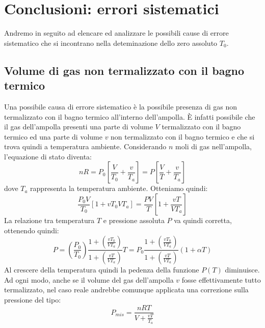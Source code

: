\section{Conclusioni: errori sistematici}
Andremo in seguito ad elencare ed analizzare le possibili cause di errore sistematico che si incontrano nella deteminazione dello zero assoluto $T_0$.

\subsection{Volume di gas non termalizzato con il bagno termico}
Una possibile causa di errore sistematico è la possibile presenza di gas non termalizzato con il bagno termico all'interno dell'ampolla.
È infatti possibile che il gas dell'ampolla presenti una parte di volume $V$ termalizzato con il bagno termico ed una parte di volume $v$ non termalizzato con il bagno termico e che si trova quindi a temperatura ambiente.
Considerando $n$ moli di gas nell'ampolla, l'equazione di stato diventa:
\begin{equation}
\label{eq:nR}
n R = P_0 \left[\frac{V}{T_0} + \frac{v}{T_a}\right] = P \left[\frac{V}{T} + \frac{v}{T_a}\right]
\end{equation}
dove $T_a$ rappresenta la temperatura ambiente.
Otteniamo quindi:
\begin{equation}
\frac{P_0 V}{T_0} \left[1 + v T_0 V T_a\right]= \frac{P V}{T} \left[1 + \frac{v T}{V T_a}\right]
\end{equation}
La relazione tra temperatura $T$  e pressione assoluta $P$ va quindi corretta, ottenendo quindi:
\begin{equation}
P = \left(\frac{P_0}{T_0}\right) \frac{1 + \left(\frac{v T_0}{V T_a} \right)}{1 + \left(\frac{v T}{V T_a}\right)} T = P_0 \frac{1 + \left(\frac {v T_0}{V T_a}\right)}{1 + \left(\frac{v T}{V T_a}\right)} \left(1 + \alpha T \right)
\end{equation}
Al crescere della temperatura quindi la pedenza della funzione $P(T)$ diminuisce.
Ad ogni modo, anche se il volume del gas dell'ampolla $v$ fosse effettivamente tutto termalizzato, nel caso reale andrebbe comunque applicata una correzione sulla pressione del tipo:
\begin{equation}
P_{mis} = \frac{n R T}{V + \frac{v T}{T_a}}
\end{equation}

